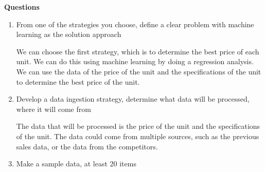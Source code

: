 \documentclass[12pt,titlepage]{article}
\begin{document}
\large{\textbf{Questions}}\\
\begin{enumerate}
    \item {
        From one of the strategies you choose, define a clear problem with machine learning as the solution approach

        We can choose the first strategy, which is to determine the best price of each unit. We can do this using machine learning
        by doing a regression analysis. We can use the data of the price of the unit and the specifications of the unit to determine
        the best price of the unit.
    }
    \item {
        Develop a data ingestion strategy, determine what data will be processed, where it will come from

        The data that will be processed is the price of the unit and the specifications of the unit. The data could come from multiple sources,
        such as the previous sales data, or the data from the competitors.
    }
    \item {
        Make a sample data, at least 20 items

}
\end{enumerate}
\end{document}
